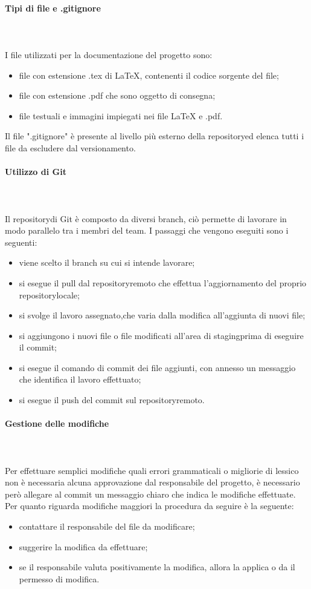 	\paragraph{Tipi di file e .gitignore} \mbox{}\\ \mbox{}\\
	I file utilizzati per la documentazione del progetto sono:
	\begin{itemize}
		\item file con estensione .tex di \LaTeX{}, contenenti il codice sorgente del file;
		\item file con estensione .pdf che sono oggetto di consegna;
		\item file testuali e immagini impiegati nei file \LaTeX{} e .pdf.
	\end{itemize}			
	Il file ".gitignore" è presente al livello più esterno della repository\glosp ed elenca tutti i file da escludere dal versionamento. 
	\paragraph{Utilizzo di Git} \mbox{}\\ \mbox{}\\
	Il repository\glosp di Git è composto da diversi branch, ciò permette di lavorare in modo parallelo tra i membri del team.  
	I passaggi che vengono eseguiti sono i seguenti:
	\begin{itemize}
		\item viene scelto il branch su cui si intende lavorare;
		\item si esegue il pull dal repository\glosp remoto che effettua l'aggiornamento del proprio repository\glosp locale;
		\item si svolge il lavoro assegnato,che varia dalla modifica all'aggiunta di nuovi file;
		\item si aggiungono i nuovi file o file modificati all'area di staging\glo prima di eseguire il commit;
		\item si esegue il comando di commit dei file aggiunti, con annesso un messaggio che identifica il lavoro effettuato;
		\item si esegue il push del commit sul repository\glosp remoto.
	\end{itemize}
	\paragraph{Gestione delle modifiche} \mbox{}\\ \mbox{}\\
	Per effettuare semplici modifiche quali errori grammaticali o migliorie di lessico non è necessaria alcuna approvazione dal responsabile del progetto, è necessario però allegare al commit un messaggio chiaro che indica le modifiche effettuate.
	Per quanto riguarda modifiche maggiori la procedura da seguire è la seguente:
	\begin{itemize}
		\item contattare il responsabile del file da modificare;
		\item suggerire la modifica da effettuare;
		\item se il responsabile valuta positivamente la modifica, allora la applica o da il permesso di modifica.
	\end{itemize}
